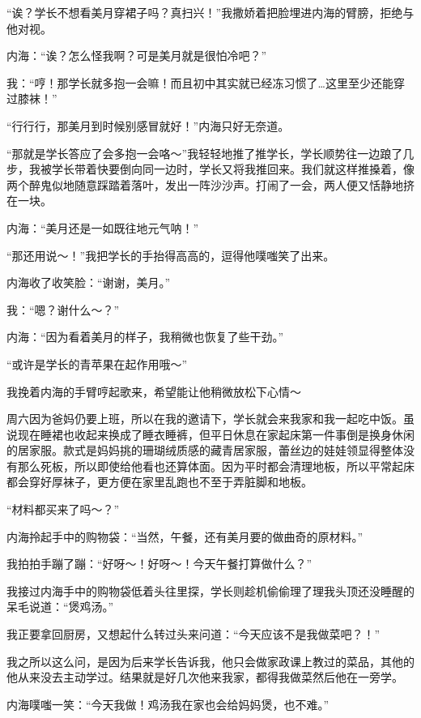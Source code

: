 “诶？学长不想看美月穿裙子吗？真扫兴！”我撒娇着把脸埋进内海的臂膀，拒绝与他对视。

内海：“诶？怎么怪我啊？可是美月就是很怕冷吧？”

我：“哼！那学长就多抱一会嘛！而且初中其实就已经冻习惯了…这里至少还能穿过膝袜！”

“行行行，那美月到时候别感冒就好！”内海只好无奈道。

“那就是学长答应了会多抱一会咯～”我轻轻地推了推学长，学长顺势往一边踉了几步，我被学长带着快要倒向同一边时，学长又将我推回来。我们就这样推搡着，像两个醉鬼似地随意踩踏着落叶，发出一阵沙沙声。打闹了一会，两人便又恬静地挤在一块。

内海：“美月还是一如既往地元气呐！”

“那还用说～！”我把学长的手抬得高高的，逗得他噗嗤笑了出来。

内海收了收笑脸：“谢谢，美月。”

我：“嗯？谢什么～？”

内海：“因为看着美月的样子，我稍微也恢复了些干劲。”

“或许是学长的青苹果在起作用哦～”

我挽着内海的手臂哼起歌来，希望能让他稍微放松下心情～


\newday{\cookie\food\sunny}



周六因为爸妈仍要上班，所以在我的邀请下，学长就会来我家和我一起吃中饭。虽说现在睡裙也收起来换成了睡衣睡裤，但平日休息在家起床第一件事倒是换身休闲的居家服。款式是妈妈挑的珊瑚绒质感的藏青居家服，蕾丝边的娃娃领显得整体没有那么死板，所以即使给他看也还算体面。因为平时都会清理地板，所以平常起床都会穿好厚袜子，更方便在家里乱跑也不至于弄脏脚和地板。 

“材料都买来了吗～？”

内海拎起手中的购物袋：“当然，午餐，还有美月要的做曲奇的原材料。”

我拍拍手蹦了蹦：“好呀～！好呀～！今天午餐打算做什么？”

我接过内海手中的购物袋低着头往里探，学长则趁机偷偷理了理我头顶还没睡醒的呆毛说道：“煲鸡汤。”

我正要拿回厨房，又想起什么转过头来问道：“今天应该不是我做菜吧？！”

我之所以这么问，是因为后来学长告诉我，他只会做家政课上教过的菜品，其他的他从来没去主动学过。结果就是好几次他来我家，都得我做菜然后他在一旁学。

内海噗嗤一笑：“今天我做！鸡汤我在家也会给妈妈煲，也不难。”

